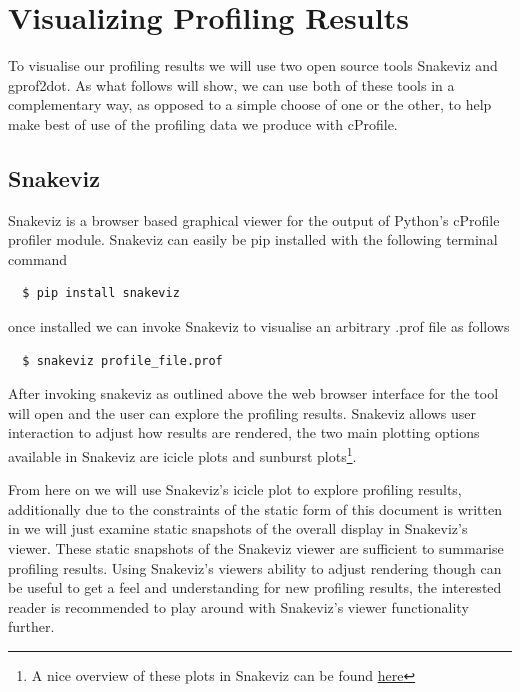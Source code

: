 \section{Visualizing Profiling Results}

To visualise our profiling results we will use two open source tools Snakeviz and gprof2dot. As what follows will show, we can use both of these tools in a complementary way, as opposed to a simple choose of one or the other, to help make best of use of the profiling data we produce with cProfile.

\subsection{Snakeviz}
Snakeviz\cite{snakeviz} is a browser based graphical viewer for the output of Python's cProfile profiler module. Snakeviz can easily be pip installed with the following terminal command

\begin{verbatim}
  $ pip install snakeviz
\end{verbatim}

once installed we can invoke Snakeviz to visualise an arbitrary .prof file as follows

\begin{verbatim}
  $ snakeviz profile_file.prof
\end{verbatim}

After invoking snakeviz as outlined above the web browser interface for the tool will open and the user can explore the profiling results. Snakeviz allows user interaction to adjust how results are rendered, the two main plotting options available in Snakeviz are icicle plots and sunburst plots\footnote{A nice overview of these plots in Snakeviz can be found \href{https://www.machinelearningplus.com/python/cprofile-how-to-profile-your-python-code/}{here}}. 

From here on we will use Snakeviz's icicle plot to explore profiling results, additionally due to the constraints of the static form of this document is written in we will just examine static snapshots of the overall display in Snakeviz's viewer. These static snapshots of the Snakeviz viewer are sufficient to summarise profiling results. Using Snakeviz's viewers ability to adjust rendering though can be useful to get a feel and understanding for new profiling results, the interested reader is recommended to play around with Snakeviz's viewer functionality further.

